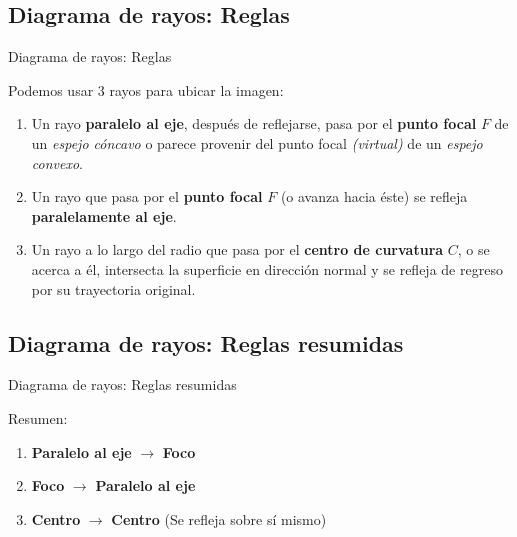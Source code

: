 \documentclass[aspectratio=43, handout]{beamer}
\begin{document}
\subsection{Diagrama de rayos: Reglas}
\begin{frame}{Diagrama de rayos: Reglas}

	Podemos usar 3 rayos para ubicar la imagen:

	\pause

	\begin{enumerate}
		\item Un rayo \textbf{paralelo al eje}, después de reflejarse, pasa por el
		      \textbf{punto focal} $F$ de un \textit{espejo cóncavo} o parece provenir del
		      punto focal \textit{(virtual)} de un \textit{espejo convexo}.

		      \pause

		\item Un rayo que pasa por el \textbf{punto focal} $F$
		      (o avanza hacia éste) se refleja \textbf{paralelamente al eje}.

		      \pause

		\item Un rayo a lo largo del radio que pasa por el
		      \textbf{centro de curvatura} $C$, o se acerca a él, intersecta la superficie
		      en dirección normal y se refleja de regreso por su trayectoria original.

	\end{enumerate}

\end{frame}

\subsection{Diagrama de rayos: Reglas resumidas}
\begin{frame}{Diagrama de rayos: Reglas resumidas}

	Resumen:
	\pause
	\begin{enumerate}
		\item \textbf{Paralelo al eje} $\rightarrow$ \textbf{Foco}

		      \pause

		\item \textbf{Foco} $\rightarrow$ \textbf{Paralelo al eje}

		      \pause

		\item \textbf{Centro} $\rightarrow$ \textbf{Centro} (Se refleja sobre sí mismo)

	\end{enumerate}

\end{frame}
\end{document}
